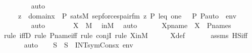 \begin{isabellebody}
\ \ \ \ \ \ \isamarkupfalse%
\ auto\isanewline
\ \ \ \ \isamarkupfalse%
\ \isamarkupfalse%
\ {\isachardoublequoteopen}{\isachardot}{\kern0pt}{\isachardot}{\kern0pt}{\isachardot}{\kern0pt}\ {\isacharequal}{\kern0pt}\ {\isacharbraceleft}{\kern0pt}\ z\ {\isasymin}\ domain{\isacharparenleft}{\kern0pt}x{\isacharparenright}{\kern0pt}\ {\isasymtimes}\ P{\isachardot}{\kern0pt}\ sats{\isacharparenleft}{\kern0pt}M{\isacharcomma}{\kern0pt}\ sep{\isacharunderscore}{\kern0pt}forces{\isacharunderscore}{\kern0pt}pair{\isacharunderscore}{\kern0pt}fm{\isacharparenleft}{\kern0pt}{\isasymphi}{\isacharparenright}{\kern0pt}{\isacharcomma}{\kern0pt}\ {\isacharbrackleft}{\kern0pt}z{\isacharcomma}{\kern0pt}\ P{\isacharcomma}{\kern0pt}\ leq{\isacharcomma}{\kern0pt}\ one{\isacharcomma}{\kern0pt}\ {\isacharless}{\kern0pt}{\isasymF}{\isacharcomma}{\kern0pt}\ {\isasymG}{\isacharcomma}{\kern0pt}\ P{\isacharcomma}{\kern0pt}\ P{\isacharunderscore}{\kern0pt}auto{\isachargreater}{\kern0pt}{\isacharbrackright}{\kern0pt}\ {\isacharat}{\kern0pt}\ env{\isacharparenright}{\kern0pt}\ {\isacharbraceright}{\kern0pt}{\isachardoublequoteclose}\ \isanewline
\ \ \ \ \ \ \isamarkupfalse%
\ auto\isanewline
\ \ \ \ \isamarkupfalse%
\ \isamarkupfalse%
\ {\isachardoublequoteopen}X\ {\isasymin}\ M{\isachardoublequoteclose}\ \isamarkupfalse%
\ inM\ \isamarkupfalse%
\ auto\isanewline
\ \ \isamarkupfalse%
\isanewline
\isanewline
\ \ \isamarkupfalse%
\ Xpname\ {\isacharcolon}{\kern0pt}\ {\isachardoublequoteopen}X\ {\isasymin}\ P{\isacharunderscore}{\kern0pt}names{\isachardoublequoteclose}\isanewline
\ \ \ \ \isamarkupfalse%
{\isacharparenleft}{\kern0pt}rule\ iffD{}{\isacharcomma}{\kern0pt}\ rule\ P{\isacharunderscore}{\kern0pt}name{\isacharunderscore}{\kern0pt}iff{\isacharcomma}{\kern0pt}\ rule\ conjI{\isacharcomma}{\kern0pt}\ rule\ XinM{\isacharparenright}{\kern0pt}\isanewline
\ \ \ \ \isamarkupfalse%
\ X{\isacharunderscore}{\kern0pt}def\ \isanewline
\ \ \ \ \isamarkupfalse%
\ assms\ HS{\isacharunderscore}{\kern0pt}iff\ \isanewline
\ \ \ \ \isamarkupfalse%
\ auto\isanewline
\isanewline
\ \ \isamarkupfalse%
\ S\ \ {\isachardoublequoteopen}S\ {\isasymequiv}\ INTsym{\isacharparenleft}{\kern0pt}Cons{\isacharparenleft}{\kern0pt}x{\isacharcomma}{\kern0pt}\ env{\isacharparenright}{\kern0pt}{\isacharparenright}{\kern0pt}{\isachardoublequoteclose}\ \isanewline

\end{isabellebody}
